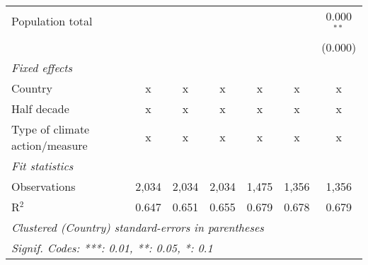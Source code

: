 \begin{tabular}{lcccccc}
   Population total                                                &         &                &                &                &                & 0.000$^{**}$\\   
                                                                   &         &                &                &                &                & (0.000)\\   
   \emph{Fixed effects}\\
   Country                                                         & x       & x              & x              & x              & x              & x\\  
   Half decade                                                     & x       & x              & x              & x              & x              & x\\  
   Type of climate action/measure                                  & x       & x              & x              & x              & x              & x\\  
   \midrule \emph{Fit statistics}\\
   Observations                                                    & 2,034   & 2,034          & 2,034          & 1,475          & 1,356          & 1,356\\  
   R$^2$                                                           & 0.647   & 0.651          & 0.655          & 0.679          & 0.678          & 0.679\\  
   \midrule
   \multicolumn{7}{l}{\emph{Clustered (Country) standard-errors in parentheses}}\\
   \multicolumn{7}{l}{\emph{Signif. Codes: ***: 0.01, **: 0.05, *: 0.1}}\\
\end{tabular}
\par\endgroup


